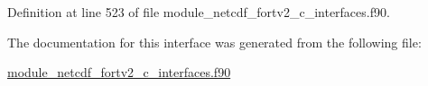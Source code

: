 Definition at line 523 of file module\+\_\+netcdf\+\_\+fortv2\+\_\+c\+\_\+interfaces.\+f90.



The documentation for this interface was generated from the following file\+:\begin{DoxyCompactItemize}
\item 
\hyperlink{module__netcdf__fortv2__c__interfaces_8f90}{module\+\_\+netcdf\+\_\+fortv2\+\_\+c\+\_\+interfaces.\+f90}\end{DoxyCompactItemize}
